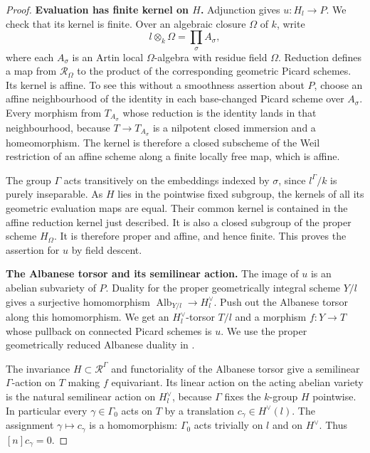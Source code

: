 \begin{proof}
\par\smallskip\noindent\textbf{Evaluation has finite kernel on $H$.}\quad
Adjunction gives $u:H_l\to P$.  We check that its kernel is
finite.  Over an algebraic closure $\Omega$ of $k$, write
\[
 l\otimes_k\Omega=\prod_{\sigma}A_\sigma,
\]
where each $A_\sigma$ is an Artin local $\Omega$-algebra with
residue field $\Omega$.  Reduction defines a map from
$\mathcal R_\Omega$ to the product of the corresponding
geometric Picard schemes.  Its kernel is affine.  To see this
without a smoothness assertion about $P$, choose an affine
neighbourhood of the identity in each base-changed Picard
scheme over $A_\sigma$.  Every morphism from $T_{A_\sigma}$
whose reduction is the identity lands in that neighbourhood,
because $T\to T_{A_\sigma}$ is a nilpotent closed immersion
and a homeomorphism.  The kernel is therefore a closed
subscheme of the Weil restriction of an affine scheme along
a finite locally free map, which is affine.

The group $\Gamma$ acts transitively on the embeddings indexed
by $\sigma$, since $l^\Gamma/k$ is purely inseparable.
As $H$ lies in the pointwise fixed subgroup, the kernels of all
its geometric evaluation maps are equal.  Their common kernel
is contained in the affine reduction kernel just described.
It is also a closed subgroup of the proper scheme $H_\Omega$.
It is therefore proper and affine, and hence finite.
This proves the assertion for $u$ by field descent.

\par\smallskip\noindent\textbf{The Albanese torsor and its semilinear action.}\quad
The image of $u$ is an abelian subvariety of $P$.
Duality for the proper geometrically integral scheme $Y/l$
gives a surjective homomorphism
$\operatorname{Alb}_{Y/l}\to H_l^\vee$.
Push out the Albanese torsor along this homomorphism.  We get
an $H_l^\vee$-torsor $T/l$ and a morphism $f:Y\to T$ whose
pullback on connected Picard schemes is $u$.
We use the proper geometrically reduced Albanese duality in
\cite[Theorem~3.2 and Remark~3.3, author pp.~12--13]{C_ACMV2026}.

The invariance $H\subset\mathcal R^\Gamma$ and functoriality
of the Albanese torsor give a semilinear $\Gamma$-action on
$T$ making $f$ equivariant.  Its linear action on the acting
abelian variety is the natural semilinear action on
$H^\vee_l$, because $\Gamma$ fixes the $k$-group $H$ pointwise.
In particular every $\gamma\in\Gamma_0$ acts on $T$ by a
translation $c_\gamma\in H^\vee(l)$.  The assignment
$\gamma\mapsto c_\gamma$ is a homomorphism: $\Gamma_0$ acts
trivially on $l$ and on $H^\vee$.  Thus $[n]c_\gamma=0$.


\end{proof}
